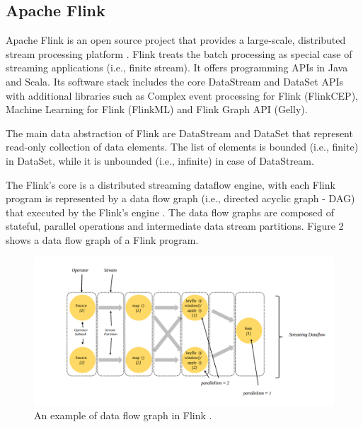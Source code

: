\documentclass[]{article}
\begin{document}
\subsection{Apache Flink}

\par Apache Flink is an open source project that provides a large-scale, distributed stream processing platform \cite{flink}. Flink treats the batch processing as special case of streaming applications (i.e., finite stream).
It offers programming APIs in Java and Scala. Its software stack includes the core DataStream and DataSet APIs with additional libraries such as Complex event processing for Flink (FlinkCEP), Machine Learning for Flink (FlinkML)  and Flink Graph API (Gelly).

\par The main data abstraction of Flink are DataStream and DataSet that represent read-only collection of data elements. The list of elements is bounded (i.e., finite) in DataSet, while it is unbounded (i.e., infinite) in case of DataStream.

\par The Flink's core is a distributed streaming dataflow engine,  with each Flink program is represented by a data flow graph (i.e., directed acyclic graph - DAG) that executed by the Flink's engine \cite{flink_paper}. The data flow graphs are composed of stateful, parallel operations and intermediate data stream partitions. Figure 2 shows a data flow graph of a Flink program.


\begin{figure}[h]
 
  \centering
    \includegraphics[width=\textwidth, height=.3\textheight]{flink_engine.png}
     \caption{ An example of data flow graph in Flink \cite{flink}.}
\end{figure} 
\end{document}

